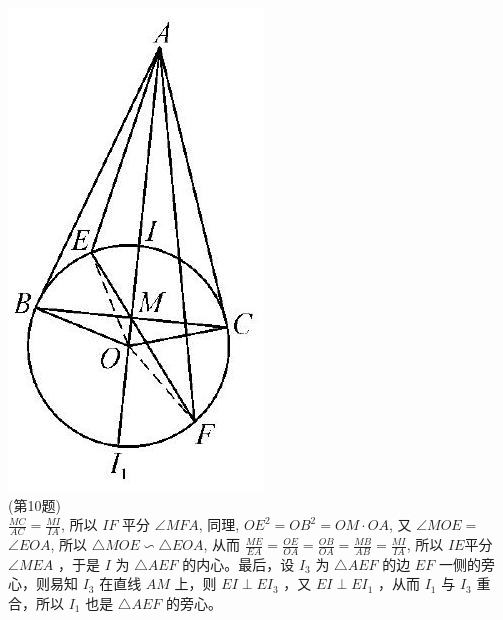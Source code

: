 \documentclass[10pt]{article}
\begin{document}
\includegraphics[max width=\textwidth, center]{2024_10_30_66b8e5e701da2093c133g-107(2)}\\
(第10题)\\
$\frac{M C}{A C}=\frac{M I}{I A}$, 所以 $I F$ 平分 $\angle M F A$, 同理, $O E^{2}=O B^{2}=O M \cdot O A$, 又 $\angle M O E=$ $\angle E O A$, 所以 $\triangle M O E \backsim \triangle E O A$, 从而 $\frac{M E}{E A}=\frac{O E}{O A}=\frac{O B}{O A}=\frac{M B}{A B}=\frac{M I}{I A}$, 所以 $I E$平分 $\angle M E A$ ，于是 $I$ 为 $\triangle A E F$ 的内心。最后，设 $I_{3}$ 为 $\triangle A E F$ 的边 $E F$ 一侧的旁心，则易知 $I_{3}$ 在直线 $A M$ 上，则 $E I \perp E I_{3}$ ，又 $E I \perp E I_{1}$ ，从而 $I_{1}$ 与 $I_{3}$ 重合，所以 $I_{1}$ 也是 $\triangle A E F$ 的旁心。
\end{document}
